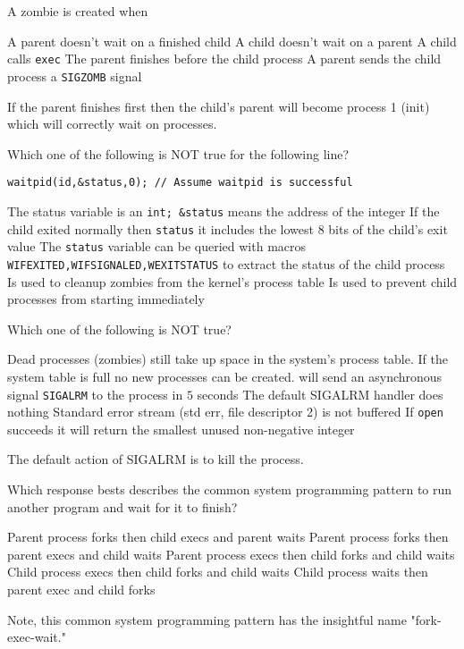 \variant
A zombie is created when
\begin{answers}
\correctanswer A parent doesn't wait on a finished child
\answer A child doesn't wait on a parent
\answer A child calls {\tt exec}
\answer The parent finishes before the child process
\answer A parent sends the child process a {\tt SIGZOMB} signal
\end{answers}
\begin{solution}
If the parent finishes first then the child's parent will become process 1 (init) which will correctly wait on processes.
\end{solution}



\variant
Which one of the following is NOT true for the following line?
\begin{verbatim}
waitpid(id,&status,0); // Assume waitpid is successful
\end{verbatim}
\begin{answers}
\answer The status variable is an {\tt int; \&status} means the address of the integer
\answer If the child exited normally then {\tt status} it includes the lowest 8 bits of the child's exit value
\answer The {\tt status} variable can be queried with macros {\tt WIFEXITED,WIFSIGNALED,WEXITSTATUS}  to extract the status of the child process
\answer Is used to cleanup zombies from the kernel's process table
\correctanswer Is used to prevent child processes from starting immediately
\end{answers}
\begin{solution}
\end{solution}


\variant
Which one of the following is NOT true?
\begin{answers}
\answer Dead processes (zombies) still take up space in the system's process table. If the system table is full no new processes can be created.
 will send an asynchronous signal {\tt SIGALRM} to the process in $5$ seconds
\correctanswer The default SIGALRM handler does nothing
\answer Standard error stream (std err, file descriptor 2) is not buffered
\answer If {\tt open} succeeds it will return the smallest unused non-negative integer
\end{answers}
\begin{solution}
The default action of SIGALRM is to kill the process.
\end{solution}


\variant
Which response bests describes the common system programming pattern to run another program and wait for it to finish?
\begin{answers}
\correctanswer Parent process forks then child execs and parent waits
\answer Parent process forks then parent execs and child waits
\answer Parent process execs then child forks and child waits
\answer Child process execs then child forks and child waits
\answer Child process waits then parent exec and child forks 
\end{answers}
\begin{solution}
Note, this common system programming pattern has the insightful name "fork-exec-wait."
\end{solution}



